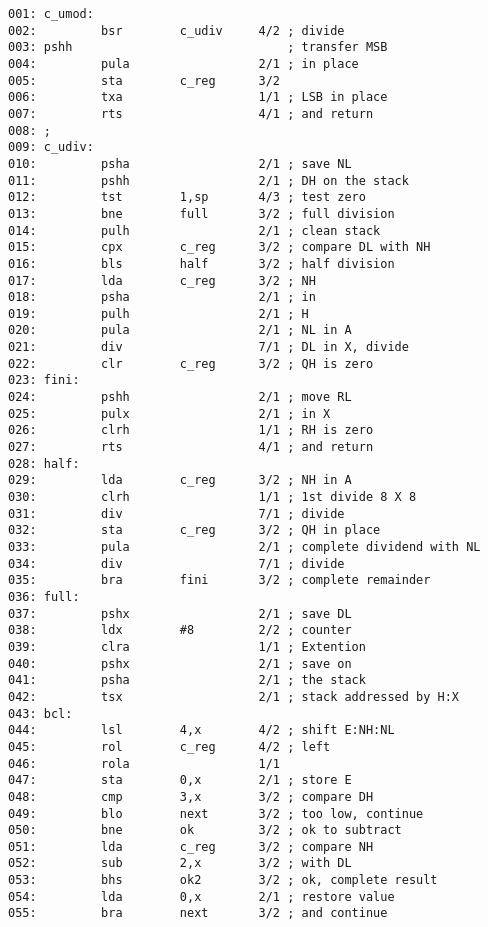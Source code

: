 \documentclass[letterpaper,10pt,titlepage]{article}
\begin{document}
\begin{verbatim}
001: c_umod:
002:         bsr        c_udiv     4/2 ; divide
003: pshh                              ; transfer MSB
004:         pula                  2/1 ; in place
005:         sta        c_reg      3/2
006:         txa                   1/1 ; LSB in place
007:         rts                   4/1 ; and return
008: ;
009: c_udiv:
010:         psha                  2/1 ; save NL
011:         pshh                  2/1 ; DH on the stack
012:         tst        1,sp       4/3 ; test zero
013:         bne        full       3/2 ; full division
014:         pulh                  2/1 ; clean stack
015:         cpx        c_reg      3/2 ; compare DL with NH
016:         bls        half       3/2 ; half division
017:         lda        c_reg      3/2 ; NH
018:         psha                  2/1 ; in
019:         pulh                  2/1 ; H
020:         pula                  2/1 ; NL in A
021:         div                   7/1 ; DL in X, divide
022:         clr        c_reg      3/2 ; QH is zero
023: fini:
024:         pshh                  2/1 ; move RL
025:         pulx                  2/1 ; in X
026:         clrh                  1/1 ; RH is zero
027:         rts                   4/1 ; and return
028: half:
029:         lda        c_reg      3/2 ; NH in A
030:         clrh                  1/1 ; 1st divide 8 X 8
031:         div                   7/1 ; divide
032:         sta        c_reg      3/2 ; QH in place
033:         pula                  2/1 ; complete dividend with NL
034:         div                   7/1 ; divide
035:         bra        fini       3/2 ; complete remainder
036: full:
037:         pshx                  2/1 ; save DL
038:         ldx        #8         2/2 ; counter
039:         clra                  1/1 ; Extention
040:         pshx                  2/1 ; save on
041:         psha                  2/1 ; the stack
042:         tsx                   2/1 ; stack addressed by H:X
043: bcl:
044:         lsl        4,x        4/2 ; shift E:NH:NL
045:         rol        c_reg      4/2 ; left
046:         rola                  1/1
047:         sta        0,x        2/1 ; store E
048:         cmp        3,x        3/2 ; compare DH
049:         blo        next       3/2 ; too low, continue
050:         bne        ok         3/2 ; ok to subtract
051:         lda        c_reg      3/2 ; compare NH
052:         sub        2,x        3/2 ; with DL
053:         bhs        ok2        3/2 ; ok, complete result
054:         lda        0,x        2/1 ; restore value
055:         bra        next       3/2 ; and continue

\end{verbatim}
\end{document}
